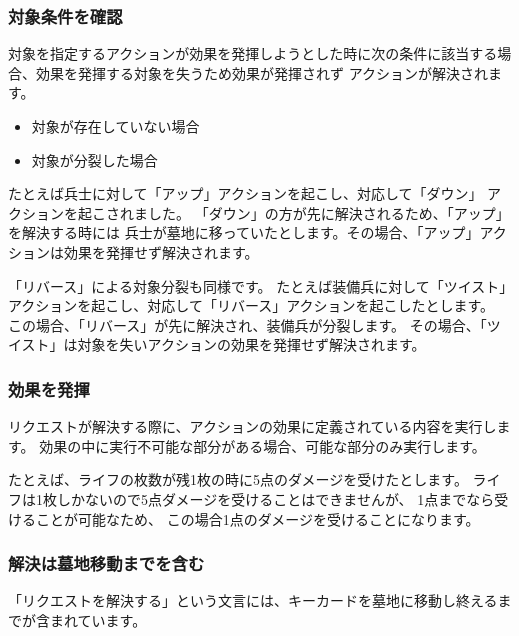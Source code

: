 \documentclass[letterpaper,10pt,dvipdfmx]{sphinxmanual}
\begin{document}
\subsubsection{対象条件を確認}
\label{\detokenize{common/common:id26}}
\sphinxAtStartPar
対象を指定するアクションが効果を発揮しようとした時に次の条件に該当する場合、効果を発揮する対象を失うため効果が発揮されず
アクションが解決されます。
\begin{itemize}
\item {} 
\sphinxAtStartPar
対象が存在していない場合

\item {} 
\sphinxAtStartPar
対象が分裂した場合

\end{itemize}

\sphinxAtStartPar
たとえば兵士に対して「アップ」アクションを起こし、対応して「ダウン」
アクションを起こされました。
「ダウン」の方が先に解決されるため、「アップ」を解決する時には
兵士が墓地に移っていたとします。その場合、「アップ」アクションは効果を発揮せず解決されます。

\sphinxAtStartPar
「リバース」による対象分裂も同様です。
たとえば装備兵に対して「ツイスト」アクションを起こし、対応して「リバース」アクションを起こしたとします。
この場合、「リバース」が先に解決され、装備兵が分裂します。
その場合、「ツイスト」は対象を失いアクションの効果を発揮せず解決されます。


\subsubsection{効果を発揮}
\label{\detokenize{common/common:id27}}
\sphinxAtStartPar
リクエストが解決する際に、アクションの効果に定義されている内容を実行します。
効果の中に実行不可能な部分がある場合、可能な部分のみ実行します。

\sphinxAtStartPar
たとえば、ライフの枚数が残1枚の時に5点のダメージを受けたとします。
ライフは1枚しかないので5点ダメージを受けることはできませんが、
1点までなら受けることが可能なため、
この場合1点のダメージを受けることになります。


\subsubsection{解決は墓地移動までを含む}
\label{\detokenize{common/common:id28}}
\sphinxAtStartPar
「リクエストを解決する」という文言には、キーカードを墓地に移動し終えるまでが含まれています。
\end{document}

